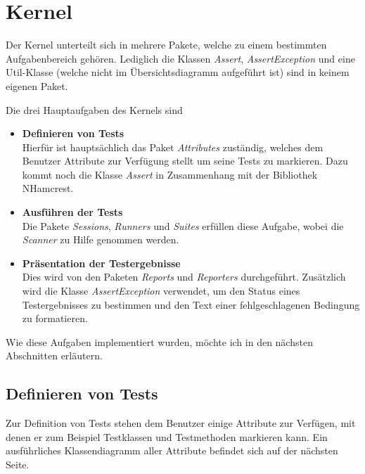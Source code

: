 \section{Kernel}

Der Kernel unterteilt sich in mehrere Pakete, welche zu einem bestimmten Aufgabenbereich gehören. Lediglich die Klassen \textit{Assert}, \textit{AssertException} und eine Util-Klasse (welche nicht im Übersichtsdiagramm aufgeführt ist) sind in keinem eigenen Paket.

Die drei Hauptaufgaben des Kernels sind
\begin{itemize}
\item \textbf{Definieren von Tests}\\
Hierfür ist hauptsächlich das Paket \textit{Attributes} zuständig, welches dem Benutzer Attribute zur Verfügung stellt um seine Tests zu markieren. Dazu kommt noch die Klasse \textit{Assert} in Zusammenhang mit der Bibliothek NHamcrest.
\item \textbf{Ausführen der Tests}\\
Die Pakete \textit{Sessions}, \textit{Runners} und \textit{Suites} erfüllen diese Aufgabe, wobei die \textit{Scanner} zu Hilfe genommen werden.
\item \textbf{Präsentation der Testergebnisse}\\
Dies wird von den Paketen \textit{Reports} und \textit{Reporters} durchgeführt. Zusätzlich wird die Klasse \textit{AssertException} verwendet, um den Status eines Testergebnisses zu bestimmen und den Text einer fehlgeschlagenen Bedingung zu formatieren.
\end{itemize}

Wie diese Aufgaben implementiert wurden, möchte ich in den nächsten Abschnitten erläutern.

\subsection{Definieren von Tests}

Zur Definition von Tests stehen dem Benutzer einige Attribute zur Verfügen, mit denen er zum Beispiel Testklassen und Testmethoden markieren kann. Ein ausführliches Klassendiagramm aller Attribute befindet sich auf der nächsten Seite.

